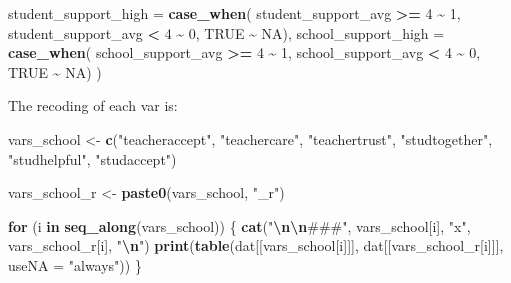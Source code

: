 \documentclass[
]{article}
\newenvironment{Shaded}{\begin{snugshade}}{\end{snugshade}}
\newcommand{\AttributeTok}[1]{\textcolor[rgb]{0.13,0.29,0.53}{#1}}
\newcommand{\ConstantTok}[1]{\textcolor[rgb]{0.56,0.35,0.01}{#1}}
\newcommand{\ControlFlowTok}[1]{\textcolor[rgb]{0.13,0.29,0.53}{\textbf{#1}}}
\newcommand{\DecValTok}[1]{\textcolor[rgb]{0.00,0.00,0.81}{#1}}
\newcommand{\FunctionTok}[1]{\textcolor[rgb]{0.13,0.29,0.53}{\textbf{#1}}}
\newcommand{\NormalTok}[1]{#1}
\newcommand{\OtherTok}[1]{\textcolor[rgb]{0.56,0.35,0.01}{#1}}
\newcommand{\SpecialCharTok}[1]{\textcolor[rgb]{0.81,0.36,0.00}{\textbf{#1}}}
\newcommand{\StringTok}[1]{\textcolor[rgb]{0.31,0.60,0.02}{#1}}
\begin{document}
\begin{Shaded}
\begin{Highlighting}[]
      \AttributeTok{student\_support\_high =} \FunctionTok{case\_when}\NormalTok{(}
\NormalTok{        student\_support\_avg }\SpecialCharTok{\textgreater{}=} \DecValTok{4} \SpecialCharTok{\textasciitilde{}} \DecValTok{1}\NormalTok{,}
\NormalTok{        student\_support\_avg }\SpecialCharTok{\textless{}} \DecValTok{4} \SpecialCharTok{\textasciitilde{}} \DecValTok{0}\NormalTok{,}
        \ConstantTok{TRUE} \SpecialCharTok{\textasciitilde{}} \ConstantTok{NA}\NormalTok{),}
      \AttributeTok{school\_support\_high =} \FunctionTok{case\_when}\NormalTok{(}
\NormalTok{        school\_support\_avg }\SpecialCharTok{\textgreater{}=} \DecValTok{4} \SpecialCharTok{\textasciitilde{}} \DecValTok{1}\NormalTok{,}
\NormalTok{        school\_support\_avg }\SpecialCharTok{\textless{}} \DecValTok{4} \SpecialCharTok{\textasciitilde{}} \DecValTok{0}\NormalTok{,}
      \ConstantTok{TRUE} \SpecialCharTok{\textasciitilde{}} \ConstantTok{NA}\NormalTok{)}
\NormalTok{  )}
\end{Highlighting}
\end{Shaded}

The recoding of each var is:

\begin{Shaded}
\begin{Highlighting}[]
\NormalTok{vars\_school }\OtherTok{\textless{}{-}} \FunctionTok{c}\NormalTok{(}\StringTok{"teacheraccept"}\NormalTok{,}
           \StringTok{"teachercare"}\NormalTok{,}
           \StringTok{"teachertrust"}\NormalTok{,}
           \StringTok{"studtogether"}\NormalTok{,}
           \StringTok{"studhelpful"}\NormalTok{,}
           \StringTok{"studaccept"}\NormalTok{)}

\NormalTok{vars\_school\_r }\OtherTok{\textless{}{-}} \FunctionTok{paste0}\NormalTok{(vars\_school,}
                        \StringTok{"\_r"}\NormalTok{)}

\ControlFlowTok{for}\NormalTok{ (i }\ControlFlowTok{in} \FunctionTok{seq\_along}\NormalTok{(vars\_school)) \{}
  \FunctionTok{cat}\NormalTok{(}\StringTok{"}\SpecialCharTok{\textbackslash{}n\textbackslash{}n}\StringTok{\#\#\#"}\NormalTok{, vars\_school[i], }\StringTok{"x"}\NormalTok{, vars\_school\_r[i], }\StringTok{"}\SpecialCharTok{\textbackslash{}n}\StringTok{"}\NormalTok{)}
  \FunctionTok{print}\NormalTok{(}\FunctionTok{table}\NormalTok{(dat[[vars\_school[i]]], dat[[vars\_school\_r[i]]], }\AttributeTok{useNA =} \StringTok{"always"}\NormalTok{))}
\NormalTok{\}}
\end{Highlighting}
\end{Shaded}
\end{document}
